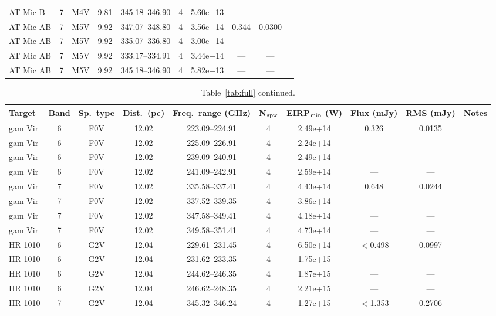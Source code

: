 \documentclass{openjournal}
\begin{document}
\begin{table}
\begin{tabularx}{\textwidth}{@{}l c c c c c c c c X@{}}
AT Mic B & 7 & M4V & 9.81 & 345.18--346.90 & 4 & 5.60e+13 & --- & --- &  \\
AT Mic AB & 7 & M5V & 9.92 & 347.07--348.80 & 4 & 3.56e+14 & 0.344 & 0.0300 &  \\
AT Mic AB & 7 & M5V & 9.92 & 335.07--336.80 & 4 & 3.00e+14 & --- & --- &  \\
AT Mic AB & 7 & M5V & 9.92 & 333.17--334.91 & 4 & 3.44e+14 & --- & --- &  \\
AT Mic AB & 7 & M5V & 9.92 & 345.18--346.90 & 4 & 5.82e+13 & --- & --- &  \\
\hline
\end{tabularx}
\end{table}

\begin{table}
\centering
\scriptsize
\caption{Table~\ref{tab:full} continued.}
\label{tab:full3}
\begin{tabularx}{\textwidth}{@{}l c c c c c c c c X@{}}
\hline
Target & Band & Sp.\ type & Dist.\ (pc) & Freq.\ range (GHz) & N$_{\rm spw}$ & EIRP$_{\rm min}$ (W) & Flux (mJy) & RMS (mJy) & Notes \\
\hline
gam Vir & 6 & F0V & 12.02 & 223.09--224.91 & 4 & 2.49e+14 & 0.326 & 0.0135 &  \\
gam Vir & 6 & F0V & 12.02 & 225.09--226.91 & 4 & 2.24e+14 & --- & --- &  \\
gam Vir & 6 & F0V & 12.02 & 239.09--240.91 & 4 & 2.49e+14 & --- & --- &  \\
gam Vir & 6 & F0V & 12.02 & 241.09--242.91 & 4 & 2.59e+14 & --- & --- &  \\
gam Vir & 7 & F0V & 12.02 & 335.58--337.41 & 4 & 4.43e+14 & 0.648 & 0.0244 &  \\
gam Vir & 7 & F0V & 12.02 & 337.52--339.35 & 4 & 3.86e+14 & --- & --- &  \\
gam Vir & 7 & F0V & 12.02 & 347.58--349.41 & 4 & 4.18e+14 & --- & --- &  \\
gam Vir & 7 & F0V & 12.02 & 349.58--351.41 & 4 & 4.73e+14 & --- & --- &  \\
HR 1010 & 6 & G2V & 12.04 & 229.61--231.45 & 4 & 6.50e+14 & $<$0.498 & 0.0997 &  \\
HR 1010 & 6 & G2V & 12.04 & 231.62--233.35 & 4 & 1.75e+15 & --- & --- &  \\
HR 1010 & 6 & G2V & 12.04 & 244.62--246.35 & 4 & 1.87e+15 & --- & --- &  \\
HR 1010 & 6 & G2V & 12.04 & 246.62--248.35 & 4 & 2.21e+15 & --- & --- &  \\
HR 1010 & 7 & G2V & 12.04 & 345.32--346.24 & 4 & 1.27e+15 & $<$1.353 & 0.2706 &  \\

\end{tabularx}
\end{table}
\end{document}
